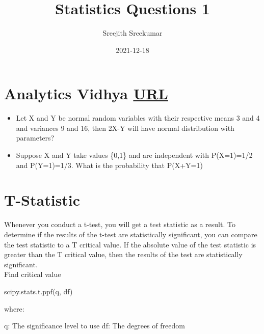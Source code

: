 \documentclass[11pt]{article}
\author{Sreejith Sreekumar}
\date{2021-12-18}
\title{Statistics Questions 1}
\begin{document}
\maketitle
\tableofcontents





\section{Analytics Vidhya \href{https://www.analyticsvidhya.com/blog/2021/04/25-probability-and-statistics-questions-to-ace-your-data-science-interviews/\#h2\_3}{\underline{URL}}}
\label{sec:org17b9ea2}

\begin{itemize}
\item Let X and Y be normal random variables with their respective means 3 and 4 and variances 9 and 16, then 2X-Y will have normal distribution with parameters?
\item Suppose X and Y take values \{0,1\} and are independent with P(X=1)=1/2 and P(Y=1)=1/3. What is the probability that P(X+Y=1)
\end{itemize}

\section{T-Statistic}
\label{sec:org70566e6}

Whenever you conduct a t-test, you will get a test statistic as a result.
To determine if the results of the t-test are statistically significant, you can compare the test statistic to a
T critical value.
If the absolute value of the test statistic is greater than the T critical value,
then the results of the test are statistically significant. \\

Find critical value

scipy.stats.t.ppf(q, df)

where:

q: The significance level to use
df: The degrees of freedom
\end{document}
